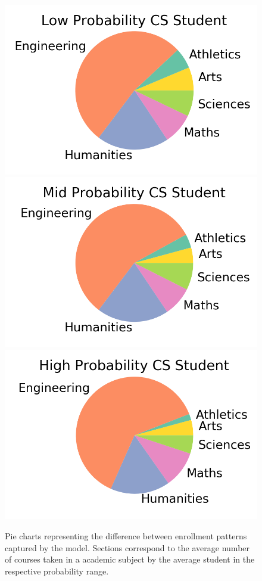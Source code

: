 \documentclass{edm_template}
\begin{document}
\begin{figure}[h]
    \centering
    \includegraphics[scale=0.20]{figures/lowpie.png}
    \includegraphics[scale=0.20]{figures/midpie.png} \\
    \includegraphics[scale=0.20]{figures/highpie.png}
    \caption{\label{fig:piecharts} Pie charts representing the difference between enrollment patterns captured by the model. Sections correspond to the average number of courses taken in a academic subject by the average student in the respective probability range.}
\end{figure}
\end{document}
